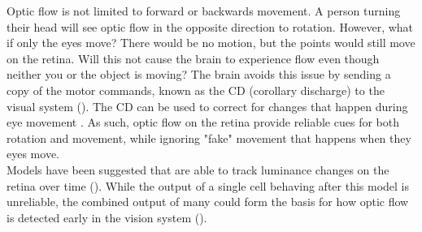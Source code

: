 \documentclass[11pt,a4paper,oneside,table,xcdraw]{article}
\begin{document}
Optic flow is not limited to forward or backwards movement. A person turning their head will see optic flow in the opposite direction to rotation. However, what if only the eyes move? There would be no motion, but the points would still move on the retina. Will this not cause the brain to experience flow even though neither you or the object is moving? The brain avoids this issue by sending a copy of the motor commands, known as the CD (corollary discharge) to the visual system (\cite{schcd}). The CD can be used to correct for changes that happen during eye movement \cite[p. 241-242]{coursebook}. As such, optic flow on the retina provide reliable cues for both rotation and movement, while ignoring "fake" movement that happens when they eyes move.\\
Models have been suggested that are able to track luminance changes on the retina over time (\cite{opticflowheading}). While the output of a single cell behaving after this model is unreliable, the combined output of many could form the basis for how optic flow is detected early in the vision system (\cite{schopticflow}).
\end{document}
